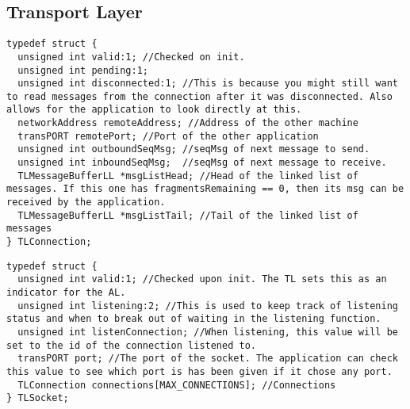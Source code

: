 \subsection{Transport Layer}

\begin{lstlisting}
typedef struct {
  unsigned int valid:1; //Checked on init.
  unsigned int pending:1;
  unsigned int disconnected:1; //This is because you might still want to read messages from the connection after it was disconnected. Also allows for the application to look directly at this.
  networkAddress remoteAddress; //Address of the other machine
  transPORT remotePort; //Port of the other application
  unsigned int outboundSeqMsg; //seqMsg of next message to send.
  unsigned int inboundSeqMsg;  //seqMsg of next message to receive.
  TLMessageBufferLL *msgListHead; //Head of the linked list of messages. If this one has fragmentsRemaining == 0, then its msg can be received by the application.
  TLMessageBufferLL *msgListTail; //Tail of the linked list of messages
} TLConnection;
\end{lstlisting}

\begin{lstlisting}
typedef struct {
  unsigned int valid:1; //Checked upon init. The TL sets this as an indicator for the AL.
  unsigned int listening:2; //This is used to keep track of listening status and when to break out of waiting in the listening function.
  unsigned int listenConnection; //When listening, this value will be set to the id of the connection listened to.
  transPORT port; //The port of the socket. The application can check this value to see which port is has been given if it chose any port.
  TLConnection connections[MAX_CONNECTIONS]; //Connections
} TLSocket;
\end{lstlisting}


